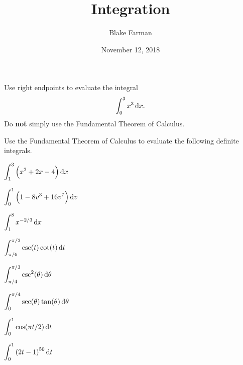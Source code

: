 \documentclass[10pt]{amsart}
\title{Integration}
\date{November 12, 2018}
\author{Blake Farman}
\begin{document}
\maketitle

\makenameslot

\begin{thm}
  Use right endpoints to evaluate the integral
  \[\int_0^3 x^3 \dif x.\]
  Do \textbf{not} simply use the Fundamental Theorem of Calculus.
\end{thm}

\newpage

Use the Fundamental Theorem of Calculus to evaluate the following definite integrals.
\begin{multicols}{2}
  \begin{thm}
    \(\displaystyle{\int_1^3 \left(x^2 + 2x - 4\right)\dif x}\)
  \end{thm}

  \begin{thm}
    \(\displaystyle{\int_0^1 \left(1 - 8v^3 + 16v^7\right) \dif v}\)
  \end{thm}
\end{multicols}

\vspace{2in}

\begin{multicols}{2}
  \begin{thm}
    \(\displaystyle{\int_1^8 x^{-2/3}\dif x}\)
  \end{thm}
  
  \begin{thm}
    \(\displaystyle{\int_{\pi/6}^{\pi/2} \csc(t)\cot(t)\dif t}\)
  \end{thm}
\end{multicols}

\vspace{2in}

\begin{multicols}{2}
  \begin{thm}
    \(\displaystyle{\int_{\pi/4}^{\pi/3} \csc^2(\theta)\dif\theta}\)
  \end{thm}

  \begin{thm}
    \(\displaystyle{\int_0^{\pi/4} \sec(\theta)\tan(\theta)\dif\theta}\)
  \end{thm}
\end{multicols}

\newpage

\begin{multicols}{2}
  \begin{thm}
    \(\displaystyle{\int_0^1\cos(\pi t/2)\dif t}\)
  \end{thm}

  \begin{thm}
    \(\displaystyle{\int_0^1 \left(2t - 1\right)^{50} \dif t}\)
  \end{thm}
\end{multicols}
\end{document}
